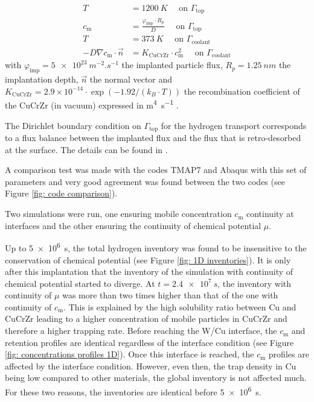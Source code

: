 \begin{subequations}
    \begin{align}
    T &= \SI{1200}{K}\quad \text { on } \Gamma_\mathrm{top}\\
    c_\mathrm{m} &=  \frac{\varphi_\mathrm{imp} \cdot R_p}{D} \quad \text { on } \Gamma_\mathrm{top}\\
    T &= \SI{373}{K} \quad \text { on } \Gamma_\mathrm{coolant}\\
    -D \nabla c_\mathrm{m} \cdot \vec{n} &= K_\mathrm{CuCrZr} \cdot c_\mathrm{m}^{2} \quad \text { on } \Gamma_\mathrm{coolant}  
    \end{align}
    \label{eq: 1D BCs}
\end{subequations}
with $\varphi_\mathrm{imp} = \SI{5e23}{m^{-2}.s^{-1}}$ the implanted particle flux, $R_p = \SI{1.25}{nm}$ the implantation depth, $\vec{n}$ the normal vector and $K_\mathrm{CuCrZr} = 2.9 \times 10^{-14}\cdot \exp{(-1.92/(k_B\cdot T))}$ the recombination coefficient of the CuCrZr (in vacuum) expressed in \si{m^4.s^{-1}} .

The Dirichlet boundary condition on $\Gamma_\mathrm{top}$ for the hydrogen transport corresponds to a flux balance between the implanted flux and the flux that is retro-desorbed at the surface.
The details can be found in .

A comparison test was made with the codes TMAP7 and Abaqus with this set of parameters and very good agreement was found between the two codes (see Figure \ref{fig: code comparison}).



Two simulations were run, one ensuring mobile concentration $c_\mathrm{m}$ continuity at interfaces and the other ensuring the continuity of chemical potential $\mu$.

Up to \SI{5e6}{s}, the total hydrogen inventory was found to be insensitive to the conservation of chemical potential (see Figure \ref{fig: 1D inventories}).
It is only after this implantation that the inventory of the simulation with continuity of chemical potential started to diverge.
At $t=\SI{2.4e7}{s}$, the inventory with continuity of $\mu$ was more than two times higher than that of the one with continuity of $c_\mathrm{m}$.
This is explained by the high solubility ratio between Cu and CuCrZr leading to a higher concentration of mobile particles in CuCrZr and therefore a higher trapping rate.
Before reaching the W/Cu interface, the $c_\mathrm{m}$ and retention profiles are identical regardless of the interface condition (see Figure \ref{fig: concentrations profiles 1D}).
Once this interface is reached, the $c_\mathrm{m}$ profiles are affected by the interface condition.
However, even then, the trap density in Cu being low compared to other materials, the global inventory is not affected much.
For these two reasons, the inventories are identical before \SI{5e6}{s}.

